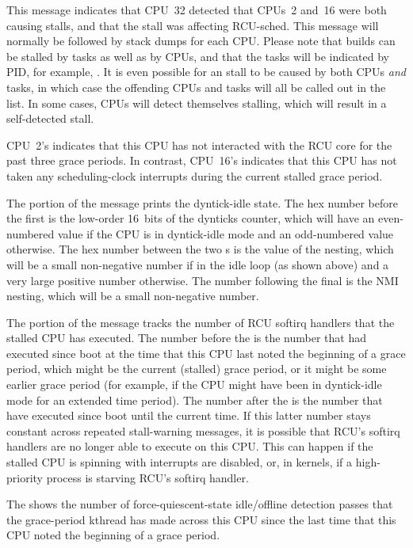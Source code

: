 This message indicates that CPU~32 detected that CPUs~2 and~16 were both
causing stalls, and that the stall was affecting RCU-sched.
This message
will normally be followed by stack dumps for each CPU\@.
Please note that
 builds can be stalled by tasks as well as by CPUs, and that
the tasks will be indicated by PID, for example, .
It is even
possible for an  stall to be caused by both CPUs \emph{and} tasks,
in which case the offending CPUs and tasks will all be called out in the list.
In some cases, CPUs will detect themselves stalling, which will result
in a self-detected stall.

CPU~2's  indicates that this CPU has not interacted with
the RCU core for the past three grace periods.
In contrast, CPU~16's 
indicates that this CPU has not taken any scheduling-clock
interrupts during the current stalled grace period.

The  portion of the message prints the dyntick-idle state.
The hex number before the first \qco{/} is the low-order 16~bits of the
dynticks counter, which will have an even-numbered value if the CPU
is in dyntick-idle mode and an odd-numbered value otherwise.
The hex
number between the two \qco{/}s is the value of the nesting, which will be
a small non-negative number if in the idle loop (as shown above) and a
very large positive number otherwise.
The number following the final
\qco{/} is the NMI nesting, which will be a small non-negative number.

The  portion of the message tracks the number of RCU softirq
handlers that the stalled CPU has executed.
The number before the \qco{/}
is the number that had executed since boot at the time that this CPU
last noted the beginning of a grace period, which might be the current
(stalled) grace period, or it might be some earlier grace period (for
example, if the CPU might have been in dyntick-idle mode for an extended
time period).
The number after the \qco{/} is the number that have executed
since boot until the current time.
If this latter number stays constant
across repeated stall-warning messages, it is possible that RCU's softirq
handlers are no longer able to execute on this CPU\@.
This can happen if
the stalled CPU is spinning with interrupts are disabled, or, in 
kernels, if a high-priority process is starving RCU's softirq handler.

The  shows the number of force-quiescent-state idle/offline
detection passes that the grace-period kthread has made across this
CPU since the last time that this CPU noted the beginning of a grace
period.

